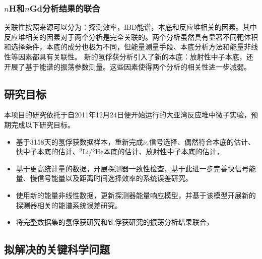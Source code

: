 \documentclass[a4paper,zihao=-4]{article}
\begin{document}
\subsubsection{$n$H和$n$Gd分析结果的联合}\label{sec:nGdnH-combine}

关联性按照来源可以分为：探测效率，IBD能谱，本底和反应堆相关的因素。其中反应堆相关的因素对于两个分析是完全关联的。两个分析虽然具有显著不同靶体积和选择条件，本底的成分也极为不同，但能量测量手段、本底分析方法和能量非线性等因素都具有关联性。 新的氢俘获分析引入了新的本底：放射性中子本底，还开展了基于能谱的振荡参数测量。这些因素使得两个分析的相关性进一步减弱。

\subsection{研究目标}
本项目的研究依托于自2011年12月24日便开始运行的大亚湾反应堆中微子实验，预期完成以下研究目标。
\begin{itemize}
	\item {} 基于3158天的氢俘获数据样本，重新完成$\overline{\nu}_e$信号选择、偶然符合本底的估计、快中子本底的估计、$^9$Li/$^8$He本底的估计、放射性中子本底的估计，
	\item {}基于更高统计量的数据，开展探测器一致性检查，基于此进一步完善快信号能量、慢信号能量以及距离时间选择效率的系统误差研究。
	\item {}使用新的能量非线性数据，更新探测器能量响应模型，并基于该模型开展新的探测器相关的能谱系统误差研究。
	\item {}将完整数据集的氢俘获研究和钆俘获研究的振荡分析结果联合，
\end{itemize}

\subsection{拟解决的关键科学问题}
\end{document}
